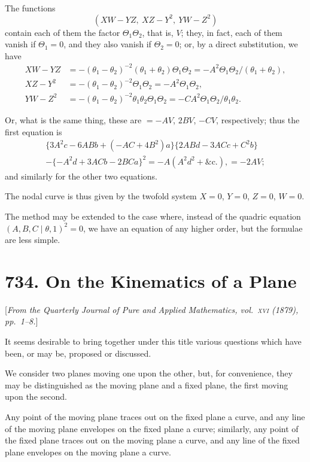\documentclass[12pt,a4paper]{article}
\theoremstyle{plain}
\begin{document}
The functions
\[
(XW-YZ,\ XZ-Y^2,\ YW-Z^2)
\]
contain each of them the factor $\Theta_1\Theta_2$, that is, $V$; they, in fact, each
of them vanish if $\Theta_1=0$, and they also vanish if $\Theta_2=0$;
or, by a direct substitution, we have
\begin{align*}
XW-YZ &= -(\theta_1-\theta_2)^{-2}(\theta_1+\theta_2)\Theta_1\Theta_2
= -A^2\Theta_1\Theta_2/(\theta_1+\theta_2),\\
XZ-Y^2 &= -(\theta_1-\theta_2)^{-2}\Theta_1\Theta_2 = -A^2\Theta_1\Theta_2,\\
YW-Z^2 &= -(\theta_1-\theta_2)^{-2}\theta_1\theta_2\Theta_1\Theta_2
= -C A^2\Theta_1\Theta_2/\theta_1\theta_2.
\end{align*}

Or, what is the same thing, these are $=-AV$, $2BV$, $-CV$,
respectively; thus the first equation is
\begin{multline*}
\{3A^2c-6ABb+(-AC+4B^2)a\}\{2ABd-3ACc+C^2b\}\\
-\{-A^2d+3ACb-2BCa\}^2 = -A(A^2d^2+\&\text{c.}), = -2AV;
\end{multline*}
and similarly for the other two equations.

The nodal curve is thus given by the twofold system $X=0$, $Y=0$,
$Z=0$, $W=0$.

The method may be extended to the case where, instead of the quadric
equation $(A,B,C\mid\theta,1)^2=0$, we have an equation of any higher
order, but the formulae are less simple.

\newpage
\section*{734. On the Kinematics of a Plane}

[\textit{From the Quarterly Journal of Pure and Applied Mathematics, vol.~\textsc{xvi} (1879),
pp.~1--8.}]

It seems desirable to bring together under this title various questions
which have been, or may be, proposed or discussed.

We consider two planes moving one upon the other, but, for convenience,
they may be distinguished as the moving plane and a fixed plane, the first
moving upon the second.

Any point of the moving plane traces out on the fixed plane a curve,
and any line of the moving plane envelopes on the fixed plane a curve;
similarly, any point of the fixed plane traces out on the moving plane a
curve, and any line of the fixed plane envelopes on the moving plane a curve.
\end{document}
